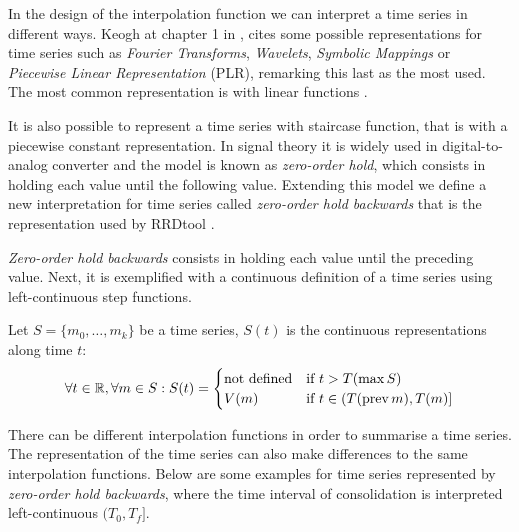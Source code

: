 In the design of the interpolation function we can interpret a time
series in different ways. Keogh at chapter 1 in \cite{last}, cites
some possible representations for time series such as \emph{Fourier
  Transforms}, \emph{Wavelets}, \emph{Symbolic Mappings} or
\emph{Piecewise Linear Representation} (PLR), remarking this last as
the most used. The most common representation is with linear
functions \parencite{keogh01}.

It is also possible to represent a time series with staircase
function, that is with a piecewise constant representation. In signal
theory it is widely used in digital-to-analog converter and the model
is known as \emph{zero-order hold}, which consists in holding each
value until the following value. Extending this model we define a new
interpretation for time series called \emph{zero-order hold backwards}
that is the representation used by RRDtool \parencite{lisa98:oetiker}.

\emph{Zero-order hold backwards} consists in holding each value until
the preceding value. Next, it is exemplified with a continuous
definition of a time series using left-continuous step functions.

\begin{definition}
  Let $S=\{m_0,\ldots,m_k\}$ be a time series, $S(t)$ is the
  continuous representations along time $t$:
\[
\forall t \in \mathbb{R}  ,\forall m \in S:
S(t) =  
\begin{cases}
  \text{not defined} & \text{if } t > T(\max S) \\
  V(m) & \text{if }  t\in (T(\operatorname*{prev} m),T(m)]
\end{cases}
\]
\end{definition}


There can be different interpolation functions in order to summarise a
time series. The representation of the time series can also make
differences to the same interpolation functions. Below are some
examples for time series represented by \emph{zero-order hold
  backwards}, where the time interval of consolidation is interpreted
left-continuous $(T_0,T_f]$.



